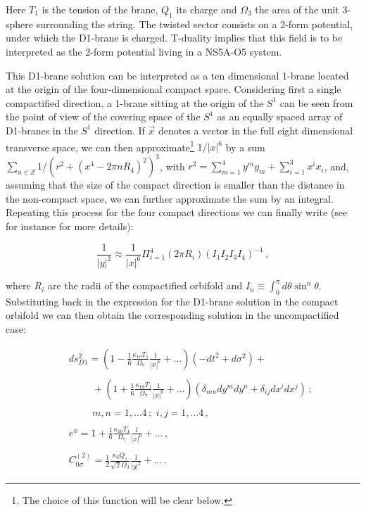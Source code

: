 \documentclass[12pt,a4paper]{article}
\begin{document}
\noindent
Here $T_1$ is the tension of the brane, $Q_1$ its charge and
$\Omega_3$ the area of the unit 3-sphere surrounding the string.
The twisted sector consists on a 2-form potential, under which the
D1-brane is charged. T-duality implies that this field
is to be interpreted as the 2-form potential living in a NS5A-O5
system.

This D1-brane solution can be interpreted as a ten dimensional 1-brane
located at the origin of the four-dimensional compact space.
Considering first a single compactified direction, a 1-brane sitting
at the origin of the $S^1$ can be seen from the point of view of the
covering space of the $S^1$ 
as an equally spaced array of D1-branes in the $S^1$ direction. If
$\vec{x}$ denotes a vector in the full eight dimensional transverse
space, we can then approximate\footnote{The choice of this function will 
be clear below.}
$1/|x|^6$ by a sum $\sum_{n\in Z}1/(r^2+(x^4-2\pi n
R_4)^2)^3$, with $r^2=\sum_{m=1}^4 y^m y_m+\sum_{i=1}^3 x^i x_i$, 
and, assuming that the size of the compact direction is smaller than
the distance in the non-compact space, we can further approximate the
sum by an integral. Repeating this process for the four compact directions
we can finally write (see 
for instance \cite{Ricc} for more details):

\begin{equation}
\frac{1}{|y|^2}\approx \frac{1}{|x|^6}\Pi_{i=1}^4 (2\pi R_i)
(I_1 I_2 I_3 I_4)^{-1}\, ,
\end{equation}

\noindent where $R_i$ are the radii of the compactified orbifold and
$I_n\equiv\int_0^{\pi}d\theta \sin^n{\theta}$.
Substituting back in the expression for the D1-brane solution in the
compact orbifold we can then obtain the corresponding 
solution in the uncompactified
case:

\begin{eqnarray}
\label{D1unc}
&&ds_{D1}^2=(1-\frac16 \frac{\kappa_{10}T_1}{\Omega_7}\frac{1}{|x|^6}
+\dots)(-dt^2+d\sigma^2)+\nonumber\\
&&\nonumber\\
&&\hspace{1cm}+(1+\frac16 \frac{\kappa_{10}T_1}{\Omega_7}
\frac{1}{|x|^6}+\dots)\left(\delta_{mn}dy^m dy^n 
+\delta_{ij}dx^i dx^j\right) \, ;\nonumber\\
&&\nonumber\\
&&\hspace{1cm}m,n=1,\dots 4\, ;\,\, i,j=1,\dots 4\, ,\nonumber\\
& &\nonumber\\
&& e^\phi=1+\frac16 \frac{\kappa_{10}T_1}{\Omega_7}\frac{1}{|x|^6}
+\dots \, ,\nonumber\\
& &\nonumber\\
&& C^{(2)}_{0\sigma}=\frac12 \frac{\kappa_6 Q_1}{\sqrt{2}\Omega_3}
\frac{1}{|y|^2}+\dots \, .
\end{eqnarray}
\end{document}
